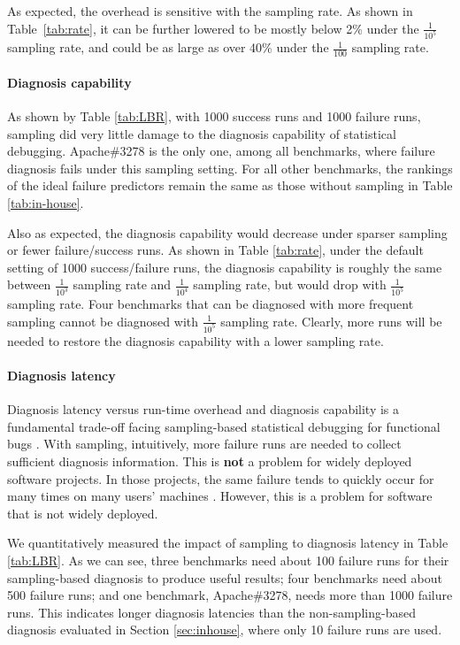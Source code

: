 As expected, the overhead is sensitive with the sampling rate. As shown in
Table~\ref{tab:rate}, it can be further lowered to be mostly below 2\% under
the $\frac{1}{10^{5}}$ sampling rate, and could be as large as over 40\% under
the $\frac{1}{100}$ sampling rate.


\paragraph{Diagnosis capability}
As shown by Table \ref{tab:LBR}, with 1000 success runs
and 1000 failure runs, sampling did very little damage to
the diagnosis capability of statistical debugging. 
Apache\#3278 is the only one, among all benchmarks, where 
failure diagnosis fails under this sampling setting.
For all other benchmarks, the
rankings of the ideal failure predictors remain the same as those 
without sampling in Table \ref{tab:in-house}.

Also as expected, the diagnosis capability would decrease under sparser
sampling or fewer failure/success runs. As shown in Table \ref{tab:rate},
under the default setting of 1000 success/failure runs, the diagnosis capability
is roughly the same between $\frac{1}{10^{3}}$ sampling rate and 
$\frac{1}{10^{4}}$ sampling
rate, but would drop with $\frac{1}{10^{5}}$ sampling rate. 
Four benchmarks that can be diagnosed 
with more frequent sampling cannot be diagnosed with
$\frac{1}{10^{5}}$ sampling rate.
Clearly, more
runs will be needed to restore the diagnosis capability with a lower
sampling rate.

\paragraph{Diagnosis latency}
Diagnosis latency versus run-time overhead and diagnosis capability 
is a fundamental trade-off facing
sampling-based statistical debugging for functional bugs \citep{liblit03,liblit05,CCI}.
With sampling, intuitively, more failure runs are needed
to collect sufficient diagnosis information. This is \textbf{not} a problem for widely
deployed software projects. In those projects, the same failure tends to quickly occur
for many times on many users' machines
\citep{hunt.sosp09}. However, this is a problem
for software that is not widely deployed.

We quantitatively measured the impact of sampling to diagnosis latency in 
Table \ref{tab:LBR}. As we can see, three benchmarks need about 100 failure
runs for their sampling-based diagnosis to produce useful results; 
four benchmarks need about 500 failure runs; and one benchmark, Apache\#3278, 
needs more than 1000 failure runs. This
indicates longer diagnosis latencies than the non-sampling-based diagnosis
evaluated in Section \ref{sec:inhouse}, where only 10 failure runs are used.

